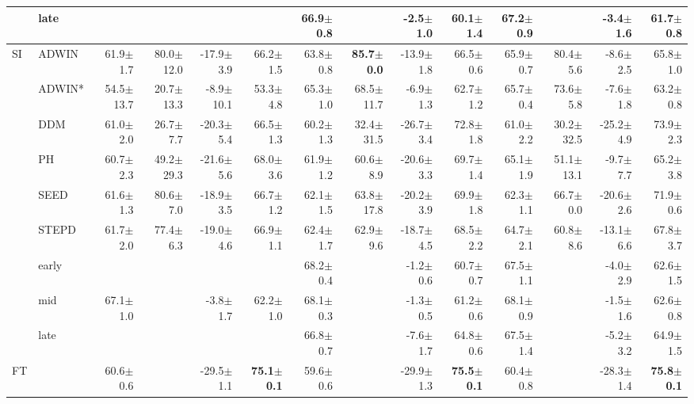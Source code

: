 \begin{tabular}{llrrrrrrrrrrrr}
 & late &  &  &  &  & 66.9\tiny{$\pm$0.8} &  & -2.5\tiny{$\pm$1.0} & 60.1\tiny{$\pm$1.4} & 67.2\tiny{$\pm$0.9} &  & -3.4\tiny{$\pm$1.6} & 61.7\tiny{$\pm$0.8} \\
\midrule
\multirow[t]{9}{*}{SI} & ADWIN & 61.9\tiny{$\pm$1.7} & 80.0\tiny{$\pm$12.0} & -17.9\tiny{$\pm$3.9} & 66.2\tiny{$\pm$1.5} & 63.8\tiny{$\pm$0.8} & \textbf{85.7\tiny{$\pm$0.0}} & -13.9\tiny{$\pm$1.8} & 66.5\tiny{$\pm$0.6} & 65.9\tiny{$\pm$0.7} & 80.4\tiny{$\pm$5.6} & -8.6\tiny{$\pm$2.5} & 65.8\tiny{$\pm$1.0} \\
 & ADWIN* & 54.5\tiny{$\pm$13.7} & 20.7\tiny{$\pm$13.3} & -8.9\tiny{$\pm$10.1} & 53.3\tiny{$\pm$4.8} & 65.3\tiny{$\pm$1.0} & 68.5\tiny{$\pm$11.7} & -6.9\tiny{$\pm$1.3} & 62.7\tiny{$\pm$1.2} & 65.7\tiny{$\pm$0.4} & 73.6\tiny{$\pm$5.8} & -7.6\tiny{$\pm$1.8} & 63.2\tiny{$\pm$0.8} \\
 & DDM & 61.0\tiny{$\pm$2.0} & 26.7\tiny{$\pm$7.7} & -20.3\tiny{$\pm$5.4} & 66.5\tiny{$\pm$1.3} & 60.2\tiny{$\pm$1.3} & 32.4\tiny{$\pm$31.5} & -26.7\tiny{$\pm$3.4} & 72.8\tiny{$\pm$1.8} & 61.0\tiny{$\pm$2.2} & 30.2\tiny{$\pm$32.5} & -25.2\tiny{$\pm$4.9} & 73.9\tiny{$\pm$2.3} \\
 & PH & 60.7\tiny{$\pm$2.3} & 49.2\tiny{$\pm$29.3} & -21.6\tiny{$\pm$5.6} & 68.0\tiny{$\pm$3.6} & 61.9\tiny{$\pm$1.2} & 60.6\tiny{$\pm$8.9} & -20.6\tiny{$\pm$3.3} & 69.7\tiny{$\pm$1.4} & 65.1\tiny{$\pm$1.9} & 51.1\tiny{$\pm$13.1} & -9.7\tiny{$\pm$7.7} & 65.2\tiny{$\pm$3.8} \\
 & SEED & 61.6\tiny{$\pm$1.3} & 80.6\tiny{$\pm$7.0} & -18.9\tiny{$\pm$3.5} & 66.7\tiny{$\pm$1.2} & 62.1\tiny{$\pm$1.5} & 63.8\tiny{$\pm$17.8} & -20.2\tiny{$\pm$3.9} & 69.9\tiny{$\pm$1.8} & 62.3\tiny{$\pm$1.1} & 66.7\tiny{$\pm$0.0} & -20.6\tiny{$\pm$2.6} & 71.9\tiny{$\pm$0.6} \\
 & STEPD & 61.7\tiny{$\pm$2.0} & 77.4\tiny{$\pm$6.3} & -19.0\tiny{$\pm$4.6} & 66.9\tiny{$\pm$1.1} & 62.4\tiny{$\pm$1.7} & 62.9\tiny{$\pm$9.6} & -18.7\tiny{$\pm$4.5} & 68.5\tiny{$\pm$2.2} & 64.7\tiny{$\pm$2.1} & 60.8\tiny{$\pm$8.6} & -13.1\tiny{$\pm$6.6} & 67.8\tiny{$\pm$3.7} \\
 & early &  &  &  &  & 68.2\tiny{$\pm$0.4} &  & -1.2\tiny{$\pm$0.6} & 60.7\tiny{$\pm$0.7} & 67.5\tiny{$\pm$1.1} &  & -4.0\tiny{$\pm$2.9} & 62.6\tiny{$\pm$1.5} \\
 & mid & 67.1\tiny{$\pm$1.0} &  & -3.8\tiny{$\pm$1.7} & 62.2\tiny{$\pm$1.0} & 68.1\tiny{$\pm$0.3} &  & -1.3\tiny{$\pm$0.5} & 61.2\tiny{$\pm$0.6} & 68.1\tiny{$\pm$0.9} &  & -1.5\tiny{$\pm$1.6} & 62.6\tiny{$\pm$0.8} \\
 & late &  &  &  &  & 66.8\tiny{$\pm$0.7} &  & -7.6\tiny{$\pm$1.7} & 64.8\tiny{$\pm$0.6} & 67.5\tiny{$\pm$1.4} &  & -5.2\tiny{$\pm$3.2} & 64.9\tiny{$\pm$1.5} \\
\midrule
FT & & 60.6\tiny{$\pm$0.6} &  & -29.5\tiny{$\pm$1.1} & \textbf{75.1\tiny{$\pm$0.1}} & 59.6\tiny{$\pm$0.6} &  & -29.9\tiny{$\pm$1.3} & \textbf{75.5\tiny{$\pm$0.1}} & 60.4\tiny{$\pm$0.8} &  & -28.3\tiny{$\pm$1.4} & \textbf{75.8\tiny{$\pm$0.1}} \\
\bottomrule
\end{tabular}
